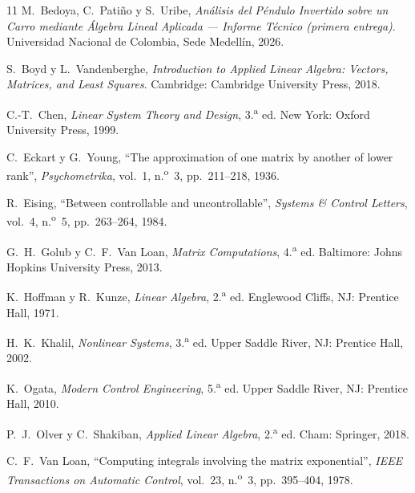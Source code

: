 \documentclass[11pt,letterpaper]{article}
\theoremstyle{definition}
\theoremstyle{plain}
\theoremstyle{remark}
\begin{document}
\begin{thebibliography}{11}
\small
\setlength{\itemsep}{0pt}\setlength{\parsep}{0pt}
M.~Bedoya, C.~Patiño y S.~Uribe, \emph{Análisis del Péndulo Invertido sobre un
Carro mediante Álgebra Lineal Aplicada --- Informe Técnico (primera entrega)}.
Universidad Nacional de Colombia, Sede Medellín, 2026.

S.~Boyd y L.~Vandenberghe, \emph{Introduction to Applied Linear Algebra:
Vectors, Matrices, and Least Squares}. Cambridge: Cambridge University Press,
2018.

C.-T.~Chen, \emph{Linear System Theory and Design}, 3.\textsuperscript{a} ed.
New York: Oxford University Press, 1999.

C.~Eckart y G.~Young, ``The approximation of one matrix by another of lower
rank'', \emph{Psychometrika}, vol.~1, n.\textsuperscript{o}~3, pp.~211--218, 1936.

R.~Eising, ``Between controllable and uncontrollable'', \emph{Systems \& Control
Letters}, vol.~4, n.\textsuperscript{o}~5, pp.~263--264, 1984.

G.~H.~Golub y C.~F.~Van Loan, \emph{Matrix Computations},
4.\textsuperscript{a} ed. Baltimore: Johns Hopkins University Press, 2013.

K.~Hoffman y R.~Kunze, \emph{Linear Algebra}, 2.\textsuperscript{a} ed.
Englewood Cliffs, NJ: Prentice Hall, 1971.

H.~K.~Khalil, \emph{Nonlinear Systems}, 3.\textsuperscript{a} ed.
Upper Saddle River, NJ: Prentice Hall, 2002.

K.~Ogata, \emph{Modern Control Engineering}, 5.\textsuperscript{a} ed.
Upper Saddle River, NJ: Prentice Hall, 2010.

P.~J.~Olver y C.~Shakiban, \emph{Applied Linear Algebra},
2.\textsuperscript{a} ed. Cham: Springer, 2018.

C.~F.~Van Loan, ``Computing integrals involving the matrix exponential'',
\emph{IEEE Transactions on Automatic Control}, vol.~23,
n.\textsuperscript{o}~3, pp.~395--404, 1978.

\end{thebibliography}
\end{document}
